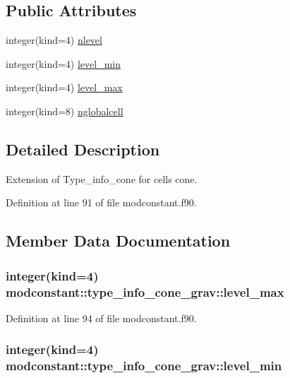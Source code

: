 \subsection*{Public Attributes}
\begin{DoxyCompactItemize}
\item 
integer(kind=4) \hyperlink{structmodconstant_1_1type__info__cone__grav_a55bb1c2c387ec91b81d634f99ac48d6d}{nlevel}
\item 
integer(kind=4) \hyperlink{structmodconstant_1_1type__info__cone__grav_a14ba0015d5f3a58fc3dcf874c685a85d}{level\-\_\-min}
\item 
integer(kind=4) \hyperlink{structmodconstant_1_1type__info__cone__grav_ab65f5eec03dde1dc860a266948f6d9e6}{level\-\_\-max}
\item 
integer(kind=8) \hyperlink{structmodconstant_1_1type__info__cone__grav_ac294c3d2656e6cd6b7088726412cfe62}{nglobalcell}
\end{DoxyCompactItemize}


\subsection{Detailed Description}
Extension of Type\-\_\-info\-\_\-cone for cells cone. 

Definition at line 91 of file modconstant.\-f90.



\subsection{Member Data Documentation}
\hypertarget{structmodconstant_1_1type__info__cone__grav_ab65f5eec03dde1dc860a266948f6d9e6}{
\subsubsection[{level\-\_\-max}]{\setlength{\rightskip}{0pt plus 5cm}integer(kind=4) modconstant\-::type\-\_\-info\-\_\-cone\-\_\-grav\-::level\-\_\-max}}\label{structmodconstant_1_1type__info__cone__grav_ab65f5eec03dde1dc860a266948f6d9e6}


Definition at line 94 of file modconstant.\-f90.

\hypertarget{structmodconstant_1_1type__info__cone__grav_a14ba0015d5f3a58fc3dcf874c685a85d}{
\subsubsection[{level\-\_\-min}]{\setlength{\rightskip}{0pt plus 5cm}integer(kind=4) modconstant\-::type\-\_\-info\-\_\-cone\-\_\-grav\-::level\-\_\-min}}\label{structmodconstant_1_1type__info__cone__grav_a14ba0015d5f3a58fc3dcf874c685a85d}


